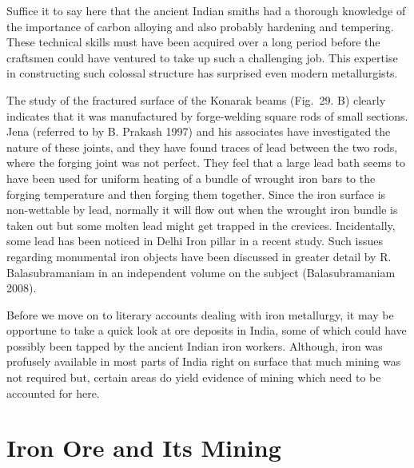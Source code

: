 Suffice it to say here that the ancient Indian smiths had a thorough knowledge of the importance of carbon alloying and also probably hardening and tempering. These technical skills must have been acquired over a long period before the craftsmen could have ventured to take up such a challenging job. This expertise in constructing such colossal structure has surprised even modern metallurgists. 

The study of the fractured surface of the Konarak beams (Fig.~29. B) clearly indicates that it was manufactured by forge-welding square rods of small sections. Jena (referred to by B. Prakash 1997) and his associates have investigated the nature of these joints, and they have found traces of lead between the two rods, where the forging joint was not perfect. They feel that a large lead bath seems to have been used for uniform heating of a bundle of wrought iron bars to the forging temperature and then forging them together. Since the iron surface is non-wettable by lead, normally it will flow out when the wrought iron bundle is taken out but some molten lead might get trapped in the crevices. Incidentally, some lead has been noticed in Delhi Iron pillar in a recent study. Such issues regarding monumental iron objects have been discussed in greater detail by R. Balasubramaniam in an independent volume on the subject (Balasubramaniam 2008). 

Before we move on to literary accounts dealing with iron metallurgy, it may be opportune to take a quick look at ore deposits in India, some of which could have possibly been tapped by the ancient Indian iron workers. Although, iron was profusely available in most parts of India right on surface that much mining was not required but, certain areas do yield evidence of mining which need to be accounted for here.

\vspace{-.3cm}

\setcounter{section}{1}
\section{Iron Ore and Its Mining}\label{chapter4-section-2}

